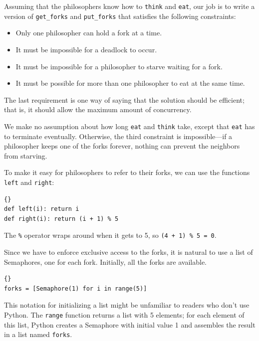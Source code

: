 \documentclass{book}
\begin{document}
Assuming that the philosophers know how to {\tt think} and {\tt eat},
our job is to write a version of {\tt get\_forks} and {\tt put\_forks}
that satisfies the following constraints:

\begin{itemize}

\item Only one philosopher can hold a fork at a time.

\item It must be impossible for a deadlock to occur.

\item It must be impossible for a philosopher to starve waiting
for a fork.

\item It must be possible for more than one philosopher
to eat at the same time.

\end{itemize}

The last requirement is one way of saying that the solution
should be efficient; that is, it should allow the maximum amount
of concurrency.

We make no assumption about how long {\tt eat} and {\tt think} take,
except that {\tt eat} has to terminate eventually.  Otherwise, the
third constraint is impossible---if a philosopher keeps one of the
forks forever, nothing can prevent the neighbors from starving.

To make it easy for philosophers to refer to their forks,
we can use the functions {\tt left} and {\tt right}:

\begin{lstlisting}[caption={Which fork?}]{}
def left(i): return i
def right(i): return (i + 1) % 5
\end{lstlisting}

The {\tt \%} operator wraps around when it gets to 5, so
{\tt (4 + 1) \% 5 = 0}.

Since we have to enforce exclusive access to the forks,
it is natural to use a list of Semaphores, one for
each fork.  Initially, all the forks are available.

\begin{lstlisting}[caption={Variables for dining philosophers}]{}
forks = [Semaphore(1) for i in range(5)]
\end{lstlisting}

This notation for initializing a list might be unfamiliar to
readers who don't use Python.  The {\tt range} function returns
a list with 5 elements; for each element of this list, Python
creates a Semaphore with initial value 1 and assembles the
result in a list named {\tt forks}.
\end{document}
